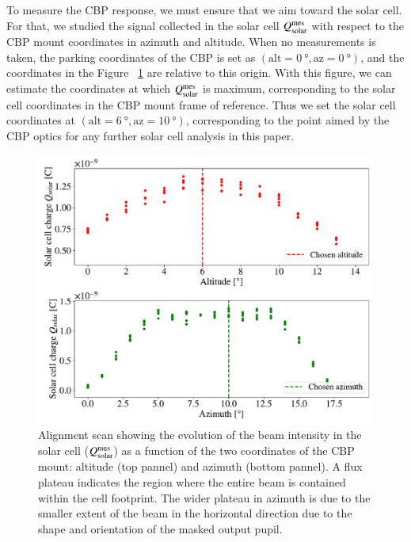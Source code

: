 To measure the CBP response, we must ensure that we aim toward the solar cell. For that, we studied the signal collected in the solar cell $Q_{\mathrm{solar}}^{\mathrm{mes}}$ with respect to the CBP mount coordinates in azimuth and altitude. When no measurements is taken, the parking coordinates of the CBP is set as $(\mathrm{alt} = \SI{0}{\degree}, \mathrm{az} = \SI{0}{\degree})$, and the coordinates in the Figure~ \ref{fig:cross_sc} are relative to this origin. With this figure, we can estimate the coordinates at which $Q_{\mathrm{solar}}^{\mathrm{mes}}$ is maximum, corresponding to the solar cell coordinates in the CBP mount frame of reference. Thus we set the solar cell coordinates at $(\mathrm{alt} = \SI{6}{\degree}, \mathrm{az} = \SI{10}{\degree})$, corresponding to the point aimed by the CBP optics for any further solar cell analysis in this paper.

\begin{figure}[h]
    \centering
    \includegraphics[width=\columnwidth]{fig/cross_solarcell.pdf}
    \caption{Alignment scan showing the evolution of the beam
      intensity in the solar cell ($Q_{\mathrm{solar}}^{\mathrm{mes}}$) as a function of the
      two coordinates of the CBP mount: altitude (top pannel) and
      azimuth (bottom pannel). A flux plateau indicates the region
      where the entire beam is contained within the cell
      footprint. The wider plateau in azimuth is due to the smaller
      extent of the beam in the horizontal direction due to the shape
      and orientation of the masked output pupil.  }
    \label{fig:cross_sc}
\end{figure}


